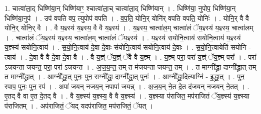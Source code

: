 \documentclass[17pt]{extarticle}
\begin{document}
1. चात्वा॑ला॒द् धिष्णि॑या॒न् धिष्णि॑याꣳ॒॒ श्चात्वा॑ला॒च् चात्वा॑ला॒द् धिष्णि॑यान् । . धिष्णि॑या॒ नुपोप॒ धिष्णि॑या॒न् धिष्णि॑या॒नुप॑ । . उप॑ वपति वप॒ त्युपोप॑ वपति । . व॒प॒ति॒ योनि॒र् योनि॑र् वपति वपति॒ योनिः॑ । . योनि॒र् वै वै योनि॒र् योनि॒र् वै । . वै य॒ज्ञ्स्य॑ य॒ज्ञ्स्य॒ वै वै य॒ज्ञ्स्य॑ । . य॒ज्ञ्स्य॒ चात्वा॑ल॒म् चात्वा॑लं ॅय॒ज्ञ्स्य॑ य॒ज्ञ्स्य॒ चात्वा॑लम् । . चात्वा॑लं ॅय॒ज्ञ्स्य॑ य॒ज्ञ्स्य॒ चात्वा॑ल॒म् चात्वा॑लं ॅय॒ज्ञ्स्य॑ । . य॒ज्ञ्स्य॑ सयोनि॒त्वाय॑ सयोनि॒त्वाय॑ य॒ज्ञ्स्य॑ य॒ज्ञ्स्य॑ सयोनि॒त्वाय॑ । . स॒यो॒नि॒त्वाय॑ दे॒वा दे॒वाः स॑योनि॒त्वाय॑ सयोनि॒त्वाय॑ दे॒वाः । . स॒यो॒नि॒त्वायेति॑ सयोनि - त्वाय॑ । . दे॒वा वै वै दे॒वा दे॒वा वै । . वै य॒ज्ञ्ं ॅय॒ज्ञ्ं ॅवै वै य॒ज्ञ्म् । . य॒ज्ञ्म् परा॒ परा॑ य॒ज्ञ्ं ॅय॒ज्ञ्म् परा᳚ । . परा॑ ऽजयन्ता जयन्त॒ परा॒ परा॑ ऽजयन्त । . अ॒ज॒य॒न्त॒ तम् त म॑जयन्ता जयन्त॒ तम् । . त माग्नी᳚द्ध्रा॒ दाग्नी᳚द्ध्रा॒त् तम् त माग्नी᳚द्ध्रात् । . आग्नी᳚द्ध्रा॒त् पुनः॒ पुन॒ राग्नी᳚द्ध्रा॒ दाग्नी᳚द्ध्रा॒त् पुनः॑ । . आग्नी᳚द्ध्रा॒दित्याग्नि॑ - इ॒द्ध्रा॒त् । . पुन॒ रपाप॒ पुनः॒ पुन॒ रप॑ । . अपा॑ जयन् नजय॒न् नपापा॑ जयन्न् । . अ॒ज॒य॒न् ने॒त दे॒त द॑जयन् नजयन् ने॒तत् । . ए॒तद् वै वा ए॒त दे॒तद् वै । . वै य॒ज्ञ्स्य॑ य॒ज्ञ्स्य॒ वै वै य॒ज्ञ्स्य॑ । . य॒ज्ञ्स्या प॑राजित॒ मप॑राजितं ॅय॒ज्ञ्स्य॑ य॒ज्ञ्स्या प॑राजितम् । . अप॑राजितं॒ ॅयद् यदप॑राजित॒ मप॑राजितं॒ ॅयत् । \newline
\end{document}

